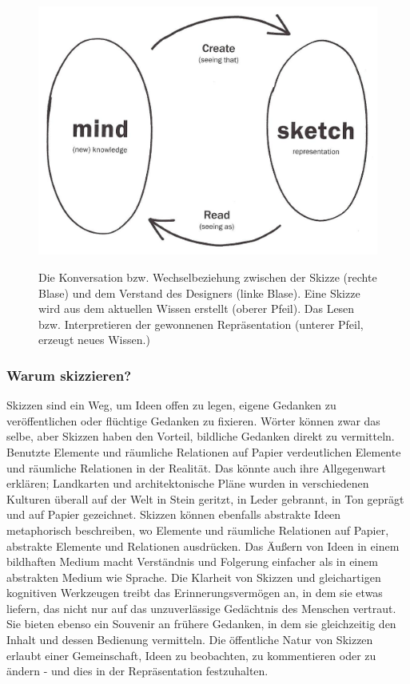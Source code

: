 \begin{figure}
	\begin{center}
        {\includegraphics[width=1\linewidth]{gfx/buxtonSketchDialogue}}
	\end{center}
		\caption[Die Skizzierwechselbeziehung. \newline \citep{Buxton:2007}]{Die Konversation bzw. Wechselbeziehung zwischen der Skizze (rechte Blase) und dem Verstand des Designers (linke Blase). Eine Skizze wird aus dem aktuellen Wissen erstellt (oberer Pfeil). Das Lesen bzw. Interpretieren der gewonnenen Repräsentation (unterer Pfeil, erzeugt neues Wissen.)}\label{fig:buxtonSketchDialogue}
\end{figure}

\subsubsection{Warum skizzieren?} 
Skizzen sind ein Weg, um Ideen offen zu legen, eigene Gedanken zu veröffentlichen oder flüchtige Gedanken zu fixieren. Wörter können zwar das selbe, aber Skizzen haben den Vorteil, bildliche Gedanken direkt zu vermitteln. Benutzte Elemente und räumliche Relationen auf Papier verdeutlichen Elemente und räumliche Relationen in der Realität. Das könnte auch ihre Allgegenwart erklären; Landkarten und architektonische Pläne wurden in verschiedenen Kulturen überall auf der Welt in Stein geritzt, in Leder gebrannt, in Ton geprägt und auf Papier gezeichnet. Skizzen können ebenfalls abstrakte Ideen metaphorisch beschreiben, wo Elemente und räumliche Relationen auf Papier, abstrakte Elemente und Relationen ausdrücken. Das Äußern von Ideen in einem bildhaften Medium macht Verständnis und Folgerung einfacher als in einem abstrakten Medium wie Sprache. Die Klarheit von Skizzen und gleichartigen kognitiven Werkzeugen treibt das Erinnerungsvermögen an, in dem sie etwas liefern, das nicht nur auf das unzuverlässige Gedächtnis des Menschen vertraut. Sie bieten ebenso ein Souvenir an frühere Gedanken, in dem sie gleichzeitig den Inhalt und dessen Bedienung vermitteln. Die öffentliche Natur von Skizzen erlaubt einer Gemeinschaft, Ideen zu beobachten, zu kommentieren oder zu ändern - und dies in der Repräsentation festzuhalten.


